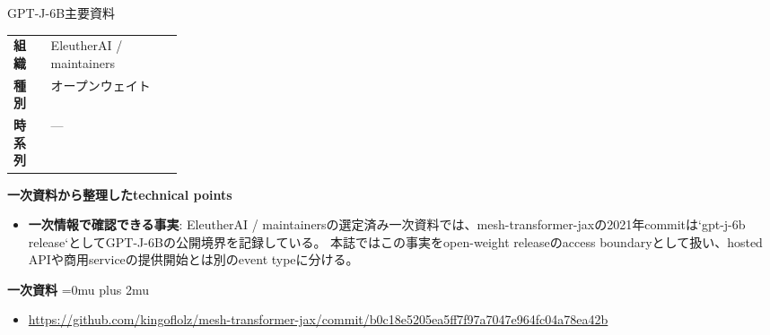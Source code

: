 \begin{technicalnote}{GPT-J-6B}{主要資料}
\begingroup
\begin{tabularx}{\linewidth}{@{}>{\bfseries}p{0.22\linewidth}X@{}}
組織 & EleutherAI / maintainers \\
種別 & オープンウェイト \\
時系列 & — \\
\end{tabularx}
\smallskip
{\bfseries 一次資料から整理したtechnical points}
\begin{itemize}[leftmargin=1.5em,itemsep=0.35em]
\item \textbf{一次情報で確認できる事実}: EleutherAI / maintainersの選定済み一次資料では、mesh-transformer-jaxの2021年commitは`gpt-j-6b release`としてGPT-J-6Bの公開境界を記録している。 本誌ではこの事実をopen-weight releaseのaccess boundaryとして扱い、hosted APIや商用serviceの提供開始とは別のevent typeに分ける。
\end{itemize}
\begin{minipage}{\linewidth}
\begin{samepage}
{\bfseries 一次資料}
\begingroup\sloppy
\Urlmuskip=0mu plus 2mu\relax
\begin{itemize}[leftmargin=1.5em,itemsep=0.25em]
\item {\scriptsize\url{https://github.com/kingoflolz/mesh-transformer-jax/commit/b0c18e5205ea5ff7f97a7047e964fc04a78ea42b}}
\end{itemize}
\endgroup
\end{samepage}
\end{minipage}
\endgroup
\end{technicalnote}
\medskip

